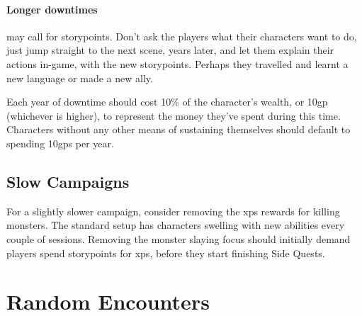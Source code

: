 \begin{multicols}{2}
\paragraph{Longer \glspl{downtime}}
may call for \glspl{storypoint}.
Don't ask the players what their characters want to do, just jump straight to the next scene, years later, and let them explain their actions in-game, with the new \glspl{storypoint}.
Perhaps they travelled and learnt a new language or made a new ally.

Each year of downtime should cost 10\% of the character's wealth, or 10\gls{gp} (whichever is higher), to represent the money they've spent during this time.
Characters without any other means of sustaining themselves should default to spending 10\glspl{gp} per year.

\subsection{Slow Campaigns}

For a slightly slower campaign, consider removing the \glspl{xp} rewards for killing monsters.
The standard setup has characters swelling with new abilities every couple of sessions.
Removing the monster slaying focus should initially demand players spend \glspl{storypoint} for \glspl{xp}, before they start finishing Side Quests.

\end{multicols}

\section{Random Encounters}
\label{encounters}

